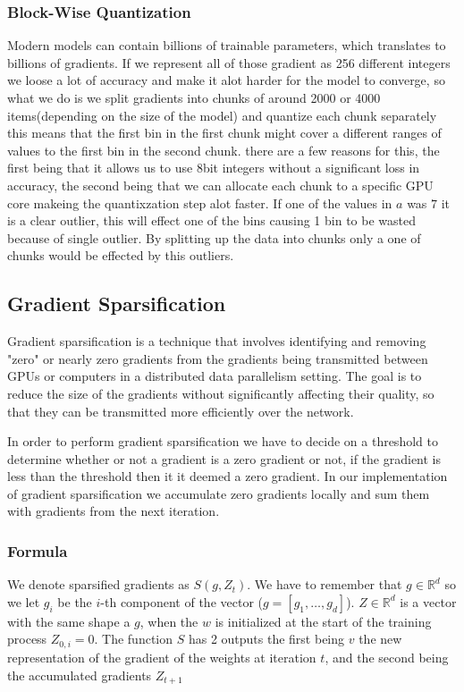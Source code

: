 \documentclass[11pt]{article}
\begin{document}
\subsubsection{Block-Wise Quantization}

Modern models can contain billions of trainable parameters, which translates to billions of gradients. If we represent all of those gradient as 256 different integers we loose a lot of accuracy and make it alot harder for the model to converge, so what we do is we split gradients into chunks of around 2000 or 4000 items(depending on the size of the model) and quantize each chunk separately this means that the first bin in the first chunk might cover a different ranges of values to the first bin in the second chunk. there are a few reasons for this, the first being that it allows us to use 8bit integers without a significant loss in accuracy, the second being that we can allocate each chunk to a specific GPU core makeing the quantixzation step alot faster. If one of the values in $a$ was $7$ it is a clear outlier, this will effect one of the bins causing 1 bin to be wasted because of single outlier. By splitting up the data into chunks only a one of chunks would be effected by this outliers.


\subsection{Gradient Sparsification}
Gradient sparsification is a technique that involves identifying and removing "zero" or nearly zero gradients from the gradients being transmitted between GPUs or computers in a distributed data parallelism setting. The goal is to reduce the size of the gradients without significantly affecting their quality, so that they can be transmitted more efficiently over the network.

In order to perform gradient sparsification we have to decide on a threshold to determine whether or not a gradient is a zero gradient or not, if the gradient is less than the threshold then it it deemed a zero gradient. In our implementation of gradient sparsification we accumulate zero gradients locally and sum them with gradients from the next iteration. 

\subsubsection{Formula}
We denote sparsified gradients as $S(g, Z_t)$. We have to remember that $g \in \mathbb{R}^d$ so we let $g_i$ be the $i$-th component of the vector ($g=[g_1,\ldots,g_d]$). $Z \in \mathbb{R}^d$ is a vector with the same shape a $g$, when the $w$ is initialized at the start of the training process $Z_{0,i} = 0$. The function $S$ has 2 outputs the first being $v$ the new representation of the gradient of the weights at iteration $t$, and the second being the accumulated gradients $Z_{t+1}$
\end{document}
